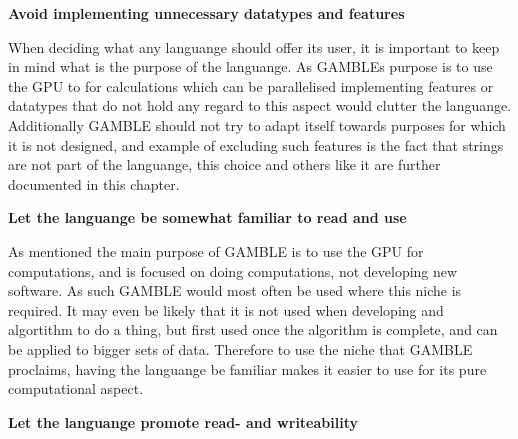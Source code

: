 \textbf{Avoid implementing unnecessary datatypes and features}

When deciding what any languange should offer its user, it is important to keep in mind what is the purpose of the languange.
As GAMBLEs purpose is to use the GPU to for calculations which can be parallelised implementing features or datatypes that do not hold any regard to this aspect would clutter the languange.
Additionally GAMBLE should not try to adapt itself towards purposes for which it is not designed, and example of excluding such features is the fact that strings are not part of the languange, this choice and others like it are further documented in this chapter.

\textbf{Let the languange be somewhat familiar to read and use}

As mentioned the main purpose of GAMBLE is to use the GPU for computations, and is focused on doing computations, not developing new software.
As such GAMBLE would most often be used where this niche is required.
It may even be likely that it is not used when developing and algortithm to do a thing, but first used once the algorithm is complete, and can be applied to bigger sets of data.
Therefore to use the niche that GAMBLE proclaims, having the languange be familiar makes it easier to use for its pure computational aspect.

\textbf{Let the languange promote read- and writeability}


